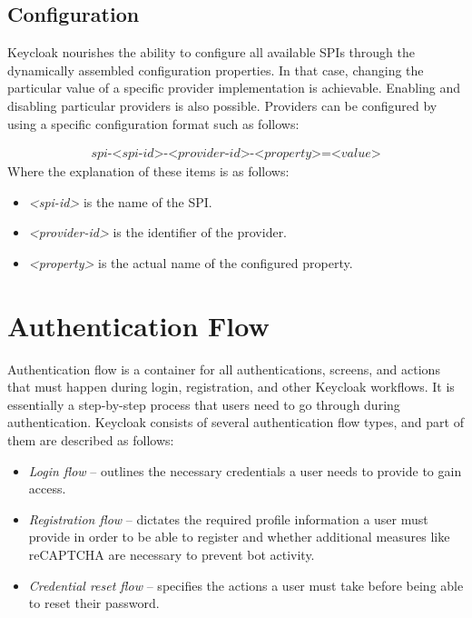 \newpage

\subsection{Configuration}
Keycloak nourishes the ability to configure all available SPIs through the dynamically assembled configuration properties.
In that case, changing the particular value of a specific provider implementation is achievable.
Enabling and disabling particular providers is also possible.\cite{keycloak-spi-config}
\newline
\newline
Providers can be configured by using a specific configuration format such as follows:

\begin{align}
    \textit{spi-<spi-id>-<provider-id>-<property>=<value>}
\end{align}
\newline
\newline
Where the explanation of these items is as follows:
\begin{itemize}
    \item \textit{<spi-id>} is the name of the SPI.
    \item \textit{<provider-id>} is the identifier of the provider.
    \item \textit{<property>} is the actual name of the configured property.
\end{itemize}

\section{Authentication Flow} \label{keycloak-authentication-flows}
Authentication flow is a container for all authentications, screens, and actions that must happen during login, registration, and other Keycloak workflows.
It is essentially a step-by-step process that users need to go through during authentication.
\newline
\newline
Keycloak consists of several authentication flow types, and part of them are described as follows:

\begin{itemize}
    \item \textit{Login flow} -- outlines the necessary credentials a user needs to provide to gain access.
    \item \textit{Registration flow} -- dictates the required profile information a user must provide in order to be able to register and whether additional measures like reCAPTCHA are necessary to prevent bot activity.
    \item \textit{Credential reset flow} -- specifies the actions a user must take before being able to reset their password.
\end{itemize}

